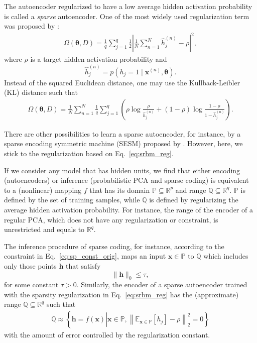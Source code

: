 \documentclass[dissertation,nocontribution]{aaltoseries}
\newcommand{\vect}[1]{\mathbf{#1}}
\newcommand{\vects}[1]{\boldsymbol{#1}}
\newcommand{\vh}[0]{\vect{h}}
\newcommand{\vx}[0]{\vect{x}}
\newcommand{\TT}[0]{{\vects{\theta}}}
\newcommand{\QQ}[0]{\mathbb{Q}}
\newcommand{\PP}[0]{\mathbb{P}}
\newcommand{\RR}[0]{\mathbb{R}}
\newcommand{\E}[0]{\mathbb{E}}
\begin{document}
The autoencoder regularized to have a low average hidden
activation probability is called a \textit{sparse}
autoencoder. One of the most widely used regularization term
was proposed by \citet{Lee2007}:
\begin{align}
    \label{eq:srbm_reg}
    \Omega(\TT, D) = \frac{1}{q} \sum_{j=1}^q \frac{1}{2} \left|
    \frac{1}{N} \sum_{n=1}^N \hat{h}_j^{(n)} - \rho
    \right|^2,
\end{align}
where $\rho$ is a target hidden activation probability and
\[
\hat{h}_j^{(n)} = p(h_j = 1 \mid \vx^{(n)}, \TT).
\]
Instead of the squared Euclidean distance, one may use the
Kullback-Leibler (KL) distance such that
\begin{align*}
    \Omega(\TT, D) = \frac{1}{N} \sum_{n=1}^N 
    \frac{1}{q} \sum_{j=1}^q \left( \rho \log
    \frac{\rho}{\hat{h}_j^{(n)}} + (1 - \rho) \log \frac{1 -
    \rho}{1 - \hat{h}_j^{(n)}} \right).
\end{align*}

There are other possibilities to learn a sparse autoencoder,
for instance, by a sparse encoding symmetric machine
(SESM)
proposed by \citet{Ranzato2008}. However, here, we stick to
the regularization based on Eq.~\eqref{eq:srbm_reg}.

If we consider any model that has hidden units, we find that
either encoding (autoencoders) or inference (probabilistic
PCA and sparse coding) is equivalent to a (nonlinear)
mapping $f$ that has its domain $\PP \subseteq \RR^p$
and range $\QQ \subseteq \RR^q$. $\PP$ is 
defined by the set of training samples, while $\QQ$ is defined by
regularizing the average hidden activation probability.
For instance, the range of the encoder
of a regular PCA, which does not have any regularization or
constraint, is unrestricted and equals to $\RR^q$.

The inference procedure of sparse
coding, for instance, according to the constraint in
Eq.~\eqref{eq:sp_const_orig}, maps an input $\vx \in \PP$ to
$\QQ$ which includes only those points $\vh$ that satisfy 
\[
\| \vh \|_0 \leq \tau,
\]
for some constant $\tau > 0$. Similarly, the encoder of a
sparse autoencoder trained with the sparsity regularization
in Eq.~\eqref{eq:srbm_reg} has the (approximate) range $\QQ
\subseteq \RR^q$ such that 
\begin{align}
    \label{eq:f_range}
    \QQ \approx \left\{\vh = f(\vx) \left| \vx \in \PP, \left\|
    \E_{\vx \in \PP}\left[ h_j \right] - \rho \right\|_2^2 =
    0 \right.\right\}
\end{align}
with the amount of error controlled by the regularization
constant.
\end{document}
